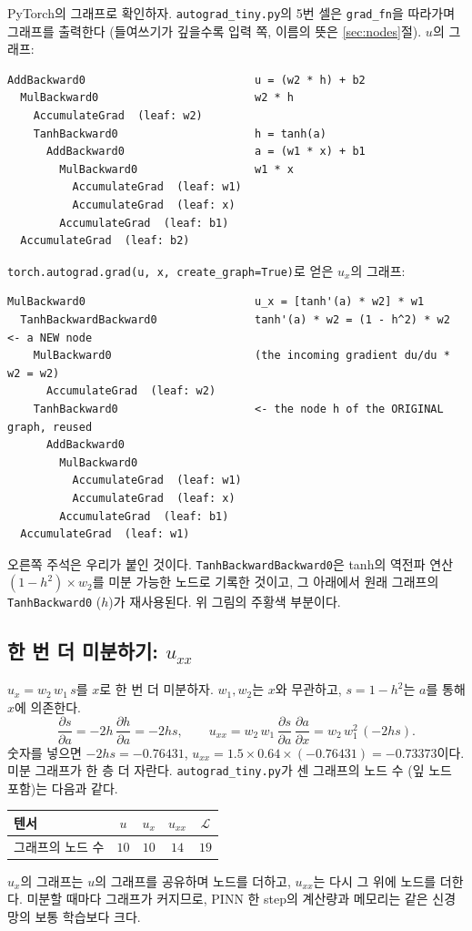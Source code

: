 \documentclass[11pt,a4paper]{article}
\newcommand{\loss}{\mathcal{L}}
\newcommand{\pd}[2]{\frac{\partial #1}{\partial #2}}
\begin{document}
PyTorch의 그래프로 확인하자. \texttt{autograd\_tiny.py}의 5번 셀은 \texttt{grad\_fn}을 따라가며 그래프를 출력한다
(들여쓰기가 깊을수록 입력 쪽, 이름의 뜻은 \ref{sec:nodes}절). $u$의 그래프:
\begin{lstlisting}[language={},numbers=none]
AddBackward0                          u = (w2 * h) + b2
  MulBackward0                        w2 * h
    AccumulateGrad  (leaf: w2)
    TanhBackward0                     h = tanh(a)
      AddBackward0                    a = (w1 * x) + b1
        MulBackward0                  w1 * x
          AccumulateGrad  (leaf: w1)
          AccumulateGrad  (leaf: x)
        AccumulateGrad  (leaf: b1)
  AccumulateGrad  (leaf: b2)
\end{lstlisting}
\texttt{torch.autograd.grad(u, x, create\_graph=True)}로 얻은 $u_x$의 그래프:
\begin{lstlisting}[language={},numbers=none]
MulBackward0                          u_x = [tanh'(a) * w2] * w1
  TanhBackwardBackward0               tanh'(a) * w2 = (1 - h^2) * w2   <- a NEW node
    MulBackward0                      (the incoming gradient du/du * w2 = w2)
      AccumulateGrad  (leaf: w2)
    TanhBackward0                     <- the node h of the ORIGINAL graph, reused
      AddBackward0
        MulBackward0
          AccumulateGrad  (leaf: w1)
          AccumulateGrad  (leaf: x)
        AccumulateGrad  (leaf: b1)
  AccumulateGrad  (leaf: w1)
\end{lstlisting}
오른쪽 주석은 우리가 붙인 것이다. \texttt{TanhBackwardBackward0}은 tanh의 역전파 연산 $(1-h^2)\times w_2$를 미분 가능한 노드로 기록한 것이고,
그 아래에서 원래 그래프의 \texttt{TanhBackward0} ($h$)가 재사용된다. 위 그림의 주황색 부분이다.

\subsection{한 번 더 미분하기: $u_{xx}$}\label{sec:uxx}

$u_x=w_2\,w_1\,s$를 $x$로 한 번 더 미분하자. $w_1,w_2$는 $x$와 무관하고, $s=1-h^2$는 $a$를 통해 $x$에 의존한다.
\[
\pd{s}{a}=-2h\,\pd{h}{a}=-2hs,\qquad
u_{xx}=w_2\,w_1\,\pd{s}{a}\,\pd{a}{x}=w_2\,w_1^2\,(-2hs).
\]
숫자를 넣으면 $-2hs=-0.76431$, $u_{xx}=1.5\times0.64\times(-0.76431)=-0.73373$이다.
미분 그래프가 한 층 더 자란다. \texttt{autograd\_tiny.py}가 센 그래프의 노드 수 (잎 노드 포함)는 다음과 같다.
\begin{center}
\begin{tabular}{@{}lcccc@{}}
\toprule
텐서 & $u$ & $u_x$ & $u_{xx}$ & $\loss$ \\
\midrule
그래프의 노드 수 & $10$ & $10$ & $14$ & $19$ \\
\bottomrule
\end{tabular}
\end{center}
$u_x$의 그래프는 $u$의 그래프를 공유하며 노드를 더하고, $u_{xx}$는 다시 그 위에 노드를 더한다.
미분할 때마다 그래프가 커지므로, PINN 한 step의 계산량과 메모리는 같은 신경망의 보통 학습보다 크다.
\end{document}
